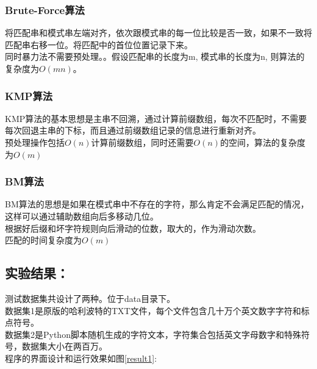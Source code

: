 \documentclass[UTF8]{ctexart}
\begin{document}
\subsubsection{Brute-Force算法}

将匹配串和模式串左端对齐，依次跟模式串的每一位比较是否一致，如果不一致将匹配串右移一位。将匹配中的首位位置记录下来。\\

同时暴力法不需要预处理。。假设匹配串的长度为m, 模式串的长度为n, 则算法的复杂度为$O(mn)$。

\subsubsection{KMP算法}

KMP算法的基本思想是主串不回溯，通过计算前缀数组，每次不匹配时，不需要每次回退主串的下标，而且通过前缀数组记录的信息进行重新对齐。\\

预处理操作包括$O(n)$计算前缀数组，同时还需要$O(n)$的空间，算法的复杂度为$O(m)$


\subsubsection{BM算法}

BM算法的思想是如果在模式串中不存在的字符，那么肯定不会满足匹配的情况，这样可以通过辅助数组向后多移动几位。\\

根据好后缀和坏字符规则向后滑动的位数，取大的，作为滑动次数。\\

匹配的时间复杂度为$O(m)$

\subsection{实验结果：}

测试数据集共设计了两种。位于data目录下。\\

数据集1是原版的哈利波特的TXT文件，每个文件包含几十万个英文数字字符和标点符号。\\
数据集2是Python脚本随机生成的字符文本，字符集合包括英文字母数字和特殊符号，数据集大小在两百万。\\

程序的界面设计和运行效果如图\ref{result1}:
\end{document}
